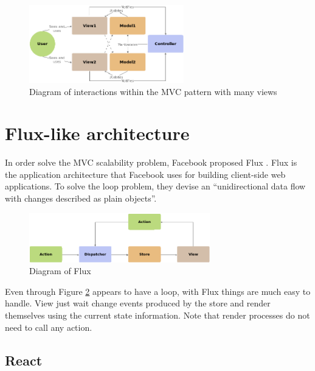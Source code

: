 \begin{figure}[htb]
	\begin{center}
		\includegraphics[width=0.6\textwidth]{./figures/mvc-complex.png}
		\caption{Diagram of interactions within the MVC pattern with many views}
		\label{F:mvc-complex}
	\end{center}
\end{figure}

\section{Flux-like architecture}

In order solve the MVC scalability problem, Facebook proposed Flux
\cite{flux-web}. Flux is the application architecture that Facebook uses for
building client-side web applications. To solve the loop problem, they devise
an “unidirectional data flow with changes described as plain objects”.

\begin{figure}[htb]
	\begin{center}
		\includegraphics[width=0.7\textwidth]{./figures/flux.png}
		\caption{Diagram of Flux}
		\label{F:flux}
	\end{center}
\end{figure}

Even through Figure \ref{F:flux} appears to have a loop, with Flux things are
much easy to handle. View just wait change events produced by the store and
render themselves using the current state information. Note that render
processes do not need to call any action.

\subsection{React}

